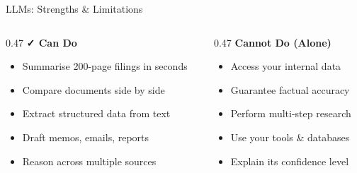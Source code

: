 \documentclass[aspectratio=169,12pt]{beamer}
\begin{document}
\begin{frame}{LLMs: Strengths \& Limitations}
  \begin{columns}[T]
    \begin{column}{0.47\textwidth}
      \textbf{\color{accent2}\faCheck\; Can Do}
      \begin{itemize}
        \item Summarise 200-page filings in seconds
        \item Compare documents side by side
        \item Extract structured data from text
        \item Draft memos, emails, reports
        \item Reason across multiple sources
      \end{itemize}
    \end{column}
    \begin{column}{0.47\textwidth}
      \textbf{\color{accent4}\faTimes\; Cannot Do (Alone)}
      \begin{itemize}
        \item Access your internal data
        \item Guarantee factual accuracy
        \item Perform multi-step research
        \item Use your tools \& databases
        \item Explain its confidence level
      \end{itemize}
    \end{column}
  \end{columns}

  \vspace{0.8cm}
  \begin{center}
  \end{center}
\end{frame}
\end{document}
